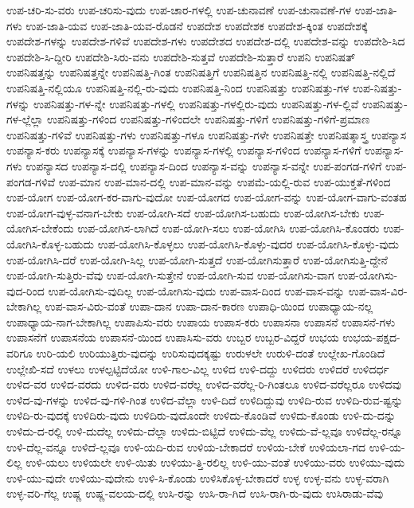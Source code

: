 {ಉಪ-ಚರಿ-ಸು-ವರು
ಉಪ-ಚರಿಸು-ವುದು
ಉಪ-ಚಾರ-ಗಳಲ್ಲಿ
ಉಪ-ಚುನಾವಣೆ
ಉಪ-ಚುನಾವಣೆ-ಗಳ
ಉಪ-ಜಾತಿ-ಗಳು
ಉಪ-ಜಾತಿ-ಯವ
ಉಪ-ಜಾತಿ-ಯವ-ರೊಡನೆ
ಉಪದೇಶ
ಉಪದೇಶಕ
ಉಪದೇಶ-ಕ್ಕಿಂತ
ಉಪದೇಶಕ್ಕೆ
ಉಪದೇಶ-ಗಳನ್ನು
ಉಪದೇಶ-ಗಳಿವೆ
ಉಪದೇಶ-ಗಳು
ಉಪದೇಶದ
ಉಪದೇಶ-ದಲ್ಲಿ
ಉಪದೇಶ-ವನ್ನು
ಉಪದೇಶಿ-ಸಿದ
ಉಪದೇಶಿ-ಸಿ-ದ್ದೀರಿ
ಉಪದೇಶಿ-ಸಿರು-ವನು
ಉಪದೇಶಿ-ಸುತ್ತವೆ
ಉಪದೇಶಿ-ಸುತ್ತಾರೆ
ಉಪನಿ
ಉಪನಿಷತ್
ಉಪನಿಷತ್ತನ್ನು
ಉಪನಿಷತ್ತನ್ನೇ
ಉಪನಿಷತ್ತಿ-ಗಿಂತ
ಉಪನಿಷತ್ತಿಗೆ
ಉಪನಿಷತ್ತಿನ
ಉಪನಿಷತ್ತಿ-ನಲ್ಲಿ
ಉಪನಿಷತ್ತಿ-ನಲ್ಲಿದೆ
ಉಪನಿಷತ್ತಿ-ನಲ್ಲಿಯೂ
ಉಪನಿಷತ್ತಿ-ನಲ್ಲಿ-ರು-ವುದು
ಉಪನಿಷತ್ತಿ-ನಿಂದ
ಉಪನಿಷತ್ತು
ಉಪನಿಷತ್ತು-ಗಳ
ಉಪ-ನಿಷತ್ತು-ಗಳನ್ನು
ಉಪನಿಷತ್ತು-ಗಳ-ನ್ನೇ
ಉಪನಿಷತ್ತು-ಗಳಲ್ಲಿ
ಉಪನಿಷತ್ತು-ಗಳಲ್ಲಿರು-ವುದು
ಉಪನಿಷತ್ತು-ಗಳ-ಲ್ಲಿವೆ
ಉಪನಿಷತ್ತು-ಗಳ-ಲ್ಲೆಲ್ಲಾ
ಉಪನಿಷತ್ತು-ಗಳಿಂದ
ಉಪನಿಷತ್ತು-ಗಳಿಂದಲೇ
ಉಪನಿಷತ್ತು-ಗಳಿಗೆ
ಉಪನಿಷತ್ತು-ಗಳಿಗೆ-ಪ್ರಮಾಣ
ಉಪನಿಷತ್ತು-ಗಳಿವೆ
ಉಪನಿಷತ್ತು-ಗಳು
ಉಪನಿಷತ್ತು-ಗಳೂ
ಉಪನಿಷತ್ತು-ಗಳೇ
ಉಪನಿಷತ್ತೇ
ಉಪನಿಷತ್ಶಾಸ್ತ್ರ
ಉಪನ್ಯಾಸ
ಉಪನ್ಯಾಸ-ಕರು
ಉಪನ್ಯಾಸಕ್ಕೆ
ಉಪನ್ಯಾಸ-ಗಳನ್ನು
ಉಪನ್ಯಾಸ-ಗಳಲ್ಲಿ
ಉಪನ್ಯಾಸ-ಗಳಿಂದ
ಉಪನ್ಯಾಸ-ಗಳಿಗೆ
ಉಪನ್ಯಾಸ-ಗಳು
ಉಪನ್ಯಾಸದ
ಉಪನ್ಯಾಸ-ದಲ್ಲಿ
ಉಪನ್ಯಾಸ-ದಿಂದ
ಉಪನ್ಯಾಸ-ವನ್ನು
ಉಪನ್ಯಾಸ-ವನ್ನೇ
ಉಪ-ಪಂಗಡ-ಗಳಿಗೆ
ಉಪ-ಪಂಗಡ-ಗಳಿವೆ
ಉಪ-ಮಾನ
ಉಪ-ಮಾನ-ದಲ್ಲಿ
ಉಪ-ಮಾನ-ವನ್ನು
ಉಪಮೆ-ಯಲ್ಲಿ-ರುವ
ಉಪ-ಯುಕ್ತತೆ-ಗಳಿಂದ
ಉಪ-ಯೋಗ
ಉಪ-ಯೋಗ-ಕರ-ವಾಗು-ವುದೋ
ಉಪ-ಯೋಗದ
ಉಪ-ಯೋಗ-ವನ್ನು
ಉಪ-ಯೋಗ-ವಾಗು-ವಂತಹ
ಉಪ-ಯೋಗ-ವುಳ್ಳ-ವನಾಗ-ಬೇಕು
ಉಪ-ಯೋಗಿ-ಸದೆ
ಉಪ-ಯೋಗಿಸ-ಬಹುದು
ಉಪ-ಯೋಗಿಸ-ಬೇಕು
ಉಪ-ಯೋಗಿಸ-ಬೇಕೆಂದು
ಉಪ-ಯೋಗಿಸ-ಲಾಗಿದೆ
ಉಪ-ಯೋಗಿ-ಸಲು
ಉಪ-ಯೋಗಿಸಿ
ಉಪ-ಯೋಗಿಸಿ-ಕೊಂಡರು
ಉಪ-ಯೋಗಿಸಿ-ಕೊಳ್ಳ-ಬಹುದು
ಉಪ-ಯೋಗಿಸಿ-ಕೊಳ್ಳಲು
ಉಪ-ಯೋಗಿಸಿ-ಕೊಳ್ಳು-ವುದರ
ಉಪ-ಯೋಗಿಸಿ-ಕೊಳ್ಳು-ವುದು
ಉಪ-ಯೋಗಿಸಿ-ದರೆ
ಉಪ-ಯೋಗಿ-ಸಿಲ್ಲ
ಉಪ-ಯೋಗಿ-ಸುತ್ತದೆ
ಉಪ-ಯೋಗಿಸುತ್ತಾರೆ
ಉಪ-ಯೋಗಿಸುತ್ತಿ-ದ್ದೇನೆ
ಉಪ-ಯೋಗಿ-ಸುತ್ತಿರು-ವೆವು
ಉಪ-ಯೋಗಿ-ಸುತ್ತೇನೆ
ಉಪ-ಯೋಗಿ-ಸುವ
ಉಪ-ಯೋಗಿಸು-ವಾಗ
ಉಪ-ಯೋಗಿಸು-ವುದ-ರಿಂದ
ಉಪ-ಯೋಗಿಸು-ವುದಿಲ್ಲ
ಉಪ-ಯೋಗಿಸು-ವುದು
ಉಪ-ವಾಸ-ದಿಂದ
ಉಪ-ವಾಸ-ವನ್ನು
ಉಪ-ವಾಸ-ವಿರ-ಬೇಕಾಗಿಲ್ಲ
ಉಪ-ವಾಸ-ವಿರು-ವಂತೆ
ಉಪಾ-ದಾನ
ಉಪಾ-ದಾನ-ಕಾರಣ
ಉಪಾಧಿ-ಯಿಂದ
ಉಪಾಧ್ಯಾಯ-ನಲ್ಲ
ಉಪಾಧ್ಯಾಯ-ನಾಗ-ಬೇಕಾಗಿಲ್ಲ
ಉಪಾಪಿಸು-ವರು
ಉಪಾಯ
ಉಪಾಸ-ಕರು
ಉಪಾಸನಾ
ಉಪಾಸನೆ
ಉಪಾಸನೆ-ಗಳು
ಉಪಾಸನೆಗೆ
ಉಪಾಸನೆಯ
ಉಪಾಸನೆ-ಯಿಂದ
ಉಪಾಸಿಸು-ವರು
ಉಬ್ಬರ
ಉಬ್ಬರ-ವಿದ್ದರೆ
ಉಭಯ
ಉಭಯ-ಪಕ್ಷದ-ವರಿಗೂ
ಉರಿ-ಯಲಿ
ಉರಿಯುತ್ತಿರು-ವುದನ್ನು
ಉರಿಸುವುದಕ್ಕಷ್ಟು
ಉರುಳಲೇ
ಉರುಳಿ-ದಂತೆ
ಉಲ್ಲೇಖ-ಗೊಂಡಿದೆ
ಉಲ್ಲೇಖಿ-ಸದೆ
ಉಳಲು
ಉಳಲ್ಪಟ್ಟಿದೆಯೋ
ಉಳಿ-ಗಾಲ-ವಿಲ್ಲ
ಉಳಿದ
ಉಳಿ-ದದ್ದು
ಉಳಿದರು
ಉಳಿದರೆ
ಉಳಿದರ್ಧ
ಉಳಿದ-ವರ
ಉಳಿದ-ವರದು
ಉಳಿದ-ವರು
ಉಳಿದ-ವರೆಲ್ಲ
ಉಳಿದ-ವರೆಲ್ಲ-ರಿ-ಗಿಂತಲೂ
ಉಳಿದ-ವರೆಲ್ಲರೂ
ಉಳಿದವು
ಉಳಿದ-ವು-ಗಳನ್ನು
ಉಳಿದ-ವು-ಗಳಿ-ಗಿಂತ
ಉಳಿದ-ವೆಲ್ಲಾ
ಉಳಿ-ದಿದೆ
ಉಳಿದಿದ್ದುವು
ಉಳಿದಿ-ರುವ
ಉಳಿದಿ-ರುವ-ಷ್ಟನ್ನು
ಉಳಿದಿ-ರು-ವುದಕ್ಕೆ
ಉಳಿದಿರು-ವುದು
ಉಳಿದಿರು-ವುದೊಂದೇ
ಉಳಿದು-ಕೊಂಡಿವೆ
ಉಳಿದು-ಕೊಂಡು
ಉಳಿ-ದು-ದನ್ನು
ಉಳಿದು-ದ-ರಲ್ಲಿ
ಉಳಿ-ದುದೆಲ್ಲ
ಉಳಿದು-ದೆಲ್ಲಾ
ಉಳಿದು-ಬಿಟ್ಟಿದೆ
ಉಳಿದು-ವೆಲ್ಲ
ಉಳಿದು-ವೆ-ಲ್ಲವೂ
ಉಳಿದೆಲ್ಲ-ರನ್ನೂ
ಉಳಿ-ದೆಲ್ಲ-ವನ್ನೂ
ಉಳಿದೆ-ಲ್ಲವೂ
ಉಳಿ-ಯದಿ-ರುವ
ಉಳಿಯ-ಬೇಕಾದರೆ
ಉಳಿಯ-ಬೇಕೆ
ಉಳಿಯಲಾ-ಗದ
ಉಳಿ-ಯ-ಲಿಲ್ಲ
ಉಳಿ-ಯಲು
ಉಳಿಯಲೇ
ಉಳಿ-ಯಿತು
ಉಳಿಯು-ತ್ತಿ-ರಲಿಲ್ಲ
ಉಳಿ-ಯು-ವಂತೆ
ಉಳಿಯು-ವರು
ಉಳಿಯು-ವುದು
ಉಳಿ-ಯು-ವುದೇ
ಉಳಿಯು-ವುದೇನು
ಉಳಿ-ಸಿ-ಕೊಂಡು
ಉಳಿಸಿಕೊಳ್ಳ-ಬೇಕಾದರೆ
ಉಳ್ಳ
ಉಳ್ಳ-ವನು
ಉಳ್ಳ-ವರಾಗಿ
ಉಳ್ಳ-ವರಿ-ಗೆಲ್ಲ
ಉಷ್ಣ
ಉಷ್ಣ-ವಲಯ-ದಲ್ಲಿ
ಉಸಿ-ರನ್ನು
ಉಸಿ-ರಾ-ಗಿದೆ
ಉಸಿ-ರಾಗಿ-ರು-ವುದು
ಉಸಿರಾಡು-ವೆವು
}
